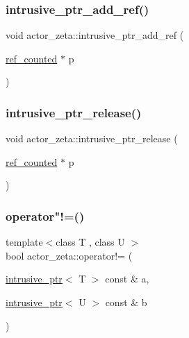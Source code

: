 \mbox{\label{namespaceactor__zeta_ae83a48a1257a4f720333741d003478d0}} 
\subsubsection{\texorpdfstring{intrusive\+\_\+ptr\+\_\+add\+\_\+ref()}{intrusive\_ptr\_add\_ref()}}
{\footnotesize\ttfamily void actor\+\_\+zeta\+::intrusive\+\_\+ptr\+\_\+add\+\_\+ref (\begin{DoxyParamCaption}\item[{\hyperlink{classactor__zeta_1_1ref__counted}{ref\+\_\+counted} $\ast$}]{p }\end{DoxyParamCaption})\hspace{0.3cm}{\ttfamily [inline]}}

\mbox{\label{namespaceactor__zeta_a9ccb791d78dcd1a7a89f2e879fb738f0}} 
\subsubsection{\texorpdfstring{intrusive\+\_\+ptr\+\_\+release()}{intrusive\_ptr\_release()}}
{\footnotesize\ttfamily void actor\+\_\+zeta\+::intrusive\+\_\+ptr\+\_\+release (\begin{DoxyParamCaption}\item[{\hyperlink{classactor__zeta_1_1ref__counted}{ref\+\_\+counted} $\ast$}]{p }\end{DoxyParamCaption})\hspace{0.3cm}{\ttfamily [inline]}}

\mbox{\label{namespaceactor__zeta_a0decf099760afba5650bca66df6d27fa}} 
\subsubsection{\texorpdfstring{operator"!=()}{operator!=()}\hspace{0.1cm}{\footnotesize\ttfamily [1/3]}}
{\footnotesize\ttfamily template$<$class T , class U $>$ \\
bool actor\+\_\+zeta\+::operator!= (\begin{DoxyParamCaption}\item[{\hyperlink{classactor__zeta_1_1intrusive__ptr}{intrusive\+\_\+ptr}$<$ T $>$ const \&}]{a,  }\item[{\hyperlink{classactor__zeta_1_1intrusive__ptr}{intrusive\+\_\+ptr}$<$ U $>$ const \&}]{b }\end{DoxyParamCaption})\hspace{0.3cm}{\ttfamily [noexcept]}}

